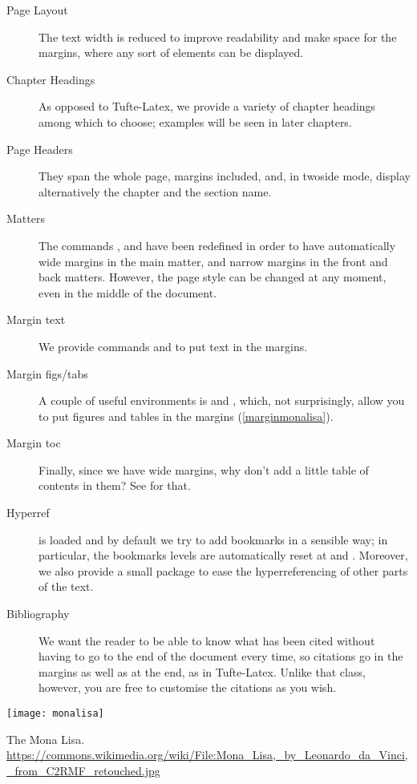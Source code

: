 \begin{description}
	\item[Page Layout] The text width is reduced to improve readability 
	and make space for the margins, where any sort of elements can be 
	displayed.
	\item[Chapter Headings] As opposed to Tufte-Latex, we provide a 
	variety of chapter headings among which to choose; examples will be 
	seen in later chapters.
	\item[Page Headers] They span the whole page, margins included, and, 
	in twoside mode, display alternatively the chapter and the section 
	name.
	\item[Matters] The commands , 
	 and  have been redefined in 
	order to have automatically wide margins in the main matter, and 
	narrow margins in the front and back matters. However, the page 
	style can be changed at any moment, even in the middle of the 
	document.
	\item[Margin text] We provide commands  and 
	 to put text in the 
	margins.
	\item[Margin figs/tabs] A couple of useful environments is 
	 and , which, not 
	surprisingly, allow you to put figures and tables in the margins 
	(\cfr \cref{marginmonalisa}).
	\item[Margin toc] Finally, since we have wide margins, why don't add 
	a little table of contents in them? See  for 
	that.
	\item[Hyperref]  is loaded and by default we try 
	to add bookmarks in a sensible way; in particular, the bookmarks 
	levels are automatically reset at  and 
	. Moreover, we also provide a small package to 
	ease the hyperreferencing of other parts of the text.
	\item[Bibliography] We want the reader to be able to know what has 
	been cited without having to go to the end of the document every 
	time, so citations go in the margins as well as at the end, as in 
	Tufte-Latex. Unlike that class, however, you are free to customise 
	the citations as you wish.
\end{description}

\begin{marginfigure}
	\texttt{[image: monalisa]}
	\caption[The Mona Lisa]{The Mona Lisa.\\
\url{https://commons.wikimedia.org/wiki/File:Mona_Lisa,_by_Leonardo_da_Vinci,_from_C2RMF_retouched.jpg}}
	\label{marginmonalisa}
\end{marginfigure}

